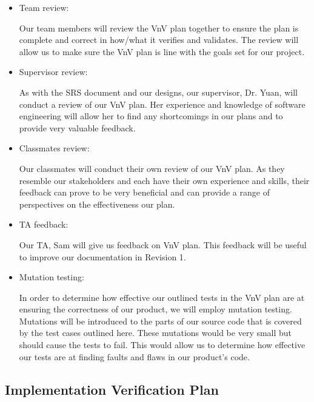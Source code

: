 \documentclass[12pt, titlepage]{article}
\begin{document}
\begin{itemize}
  \item Team review:

      Our team members will review the VnV plan together to ensure the plan is complete and correct in how/what it verifies and validates. The review will allow us to make sure the VnV plan is line with the goals set for our project.
  
  \item Supervisor review:

      As with the SRS document and our designs, our supervisor, Dr. Yuan, will conduct a review of our VnV plan. Her experience and knowledge of software engineering will allow her to find any shortcomings in our plans and to provide very valuable feedback.

  \item Classmates review:

      Our classmates will conduct their own review of our VnV plan. As they resemble our stakeholders and each have their own experience and skills, their feedback can prove to be very beneficial and can provide a range of perspectives on the effectiveness our plan.
      
  \item TA feedback:

      Our TA, Sam will give us feedback on VnV plan.  This feedback will be useful to improve our documentation in Revision 1.

  \item Mutation testing:

      In order to determine how effective our outlined tests in the VnV plan are at ensuring the correctness of our product, we will employ mutation testing. Mutations will be introduced to the parts of our source code that is covered by the test cases outlined here. These mutations would be very small but should cause the tests to fail. This would allow us to determine how effective our tests are at finding faults and flaws in our product's code.

\end{itemize}

\subsection{Implementation Verification Plan}
\end{document}
